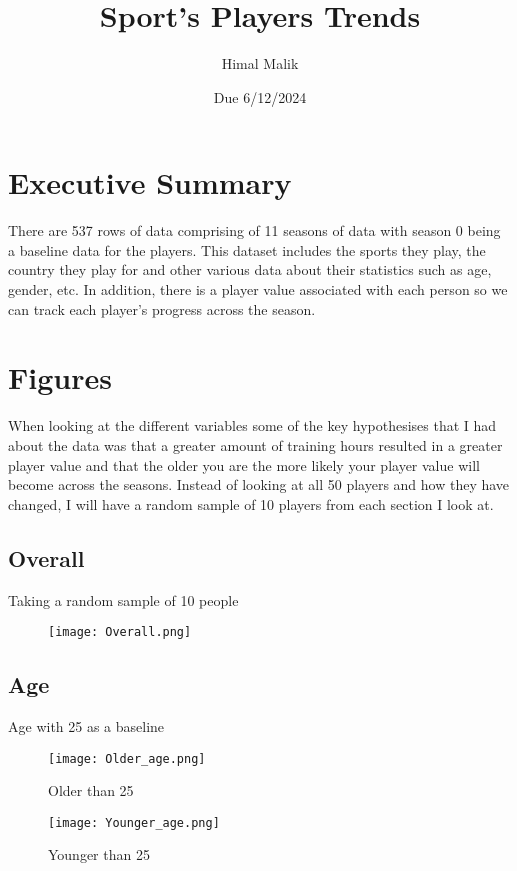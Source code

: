 \documentclass{exam}
\title{Sport's Players Trends}
\author{Himal Malik}
\date{Due 6/12/2024}
\begin{document}
\maketitle



\section{Executive Summary}
There are 537 rows of data comprising of 11 seasons of data with season 0 being a baseline data for the players. This dataset includes the sports they play, the country they play for and other various data about their statistics such as age, gender, etc. In addition, there is a player value associated with each person so we can track each player's progress across the season.


\section{Figures}
When looking at the different variables some of the key hypothesises that I had about the data was that a greater amount of training hours resulted in a greater player value and that the older you are the more likely your player value will become across the seasons. Instead of looking at all 50 players and how they have changed, I will have a random sample of 10 players from each section I look at.

\subsection{Overall}
Taking a random sample of 10 people

\begin{figure}[h]
\texttt{[image: Overall.png]}
\centering
\end{figure}

\subsection{Age}
Age with 25 as a baseline

\begin{figure}[h]
  \centering
  \begin{minipage}[b]{0.45\textwidth}
    \texttt{[image: Older\_age.png]}
    \caption{Older than 25}
  \end{minipage}
  \hfill
  \begin{minipage}[b]{0.45\textwidth}
    \texttt{[image: Younger\_age.png]}
    \caption{Younger than 25}
  \end{minipage}
\end{figure}
\end{document}
